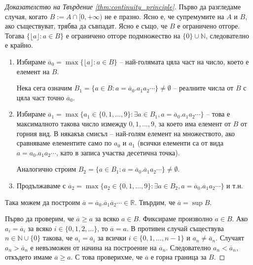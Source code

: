 \begin{proof}[Доказателство на Твърдение \ref{thm:continuity_principle}]
Първо да разгледаме случая, когато $B := A \cap [0, +\infty)$ не е празно. Ясно е, че супремумите на $A$ и $B$, ако съществуват, трябва да съвпадат. Ясно е също, че $B$ е ограничено отгоре. Тогава $\{\lfloor a \rfloor : a \in B\}$ е ограничено отгоре подмножество на $\{0\} \cup \mathbb{N}$, следователно е крайно.

\begin{enumerate}
    \item Избираме $\overline{a}_0 = \max \{\lfloor a \rfloor : a \in B\}$ -- най-голямата цяла част на число, което е елемент на $B$.
    
    Нека сега означим $B_1 = \{a \in B : a = \overline{a}_0.a_1a_2\cdots\} \neq \emptyset$ -- реалните числа от $B$ с цяла част точно $\overline{a}_0$.

    \item Избираме $\overline{a}_1 = \max \{a_1 \in \{0, 1, \dots, 9\} : \exists a \in B_1, a = \overline{a}_0.a_1a_2\cdots\}$ -- това е максималното такова число измежду $0, 1, \dots, 9$, за което има елемент от $B$ от горния вид. В някакъв смисъл -- най-голям елемент на множеството, ако сравняваме елементите само по $a_0$ и $a_1$ (всички елементи са от вида $a = a_0.a_1a_2\cdots$, като в записа участва десетична точка).

    Аналогично строим $B_2 = \{a \in B_1 : a = \overline{a}_0.\overline{a}_1a_2\cdots\} \neq \emptyset$.

    \item Продължаваме с $\overline{a}_2 = \max \{a_2 \in \{0, 1, \dots, 9\} : \exists a \in B_2, a = \overline{a}_0.\overline{a}_1a_2\cdots\}$ и т.н.
\end{enumerate}

Така можем да построим $\overline{a} = \overline{a}_0.\overline{a}_1\overline{a}_2\cdots \in \mathbb{R}$. Твърдим, че $\overline{a} = \sup B$.

Първо да проверим, че $\overline{a} \ge a$ за всяко $a \in B$. Фиксираме произволно $a \in B$. Ако $a_i = \overline{a}_i$ за всяко $i \in \{0, 1, 2, \dots\}$, то $\overline{a} = a$. В противен случай съществува $n \in \mathbb{N} \cup \{0\}$ такова, че $a_i = \overline{a}_i$ за всички $i \in \{0, 1, \dots, n - 1\}$ и $a_n \neq \overline{a}_n$. Случаят $a_n > \overline{a}_n$ е невъзможен от начина на построение на $\overline{a}_n$. Следователно $a_n < \overline{a}_n$, откъдето имаме $\overline{a} \ge a$. С това проверихме, че $\overline{a}$ е горна граница за $B$.


\end{proof}
